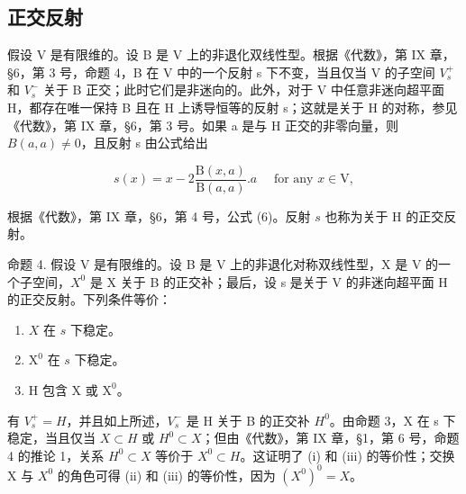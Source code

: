 \subsection{正交反射}

假设 V 是有限维的。设 B 是 V 上的非退化双线性型。根据《代数》，第 IX 章，§6，第 3 号，命题 4，B 在 V 中的一个反射 s 下不变，当且仅当 V 的子空间 \(V_{s}^{+}\) 和 \(V_{s}^{-}\) 关于 B 正交；此时它们是非迷向的。此外，对于 V 中任意非迷向超平面 H，都存在唯一保持 B 且在 H 上诱导恒等的反射 s；这就是关于 H 的对称，参见《代数》，第 IX 章，§6，第 3 号。如果 a 是与 H 正交的非零向量，则 \(B(a,a)\neq0\)，且反射 s 由公式给出

\[
s (x) = x - 2 \frac {\mathrm{B} (x , a)}{\mathrm{B} (a , a)}. a \quad \text { for   any } x \in \mathrm{V},\tag{4}
\]

根据《代数》，第 IX 章，§6，第 4 号，公式 (6)。反射 \(s\) 也称为关于 H 的正交反射。

命题 4. 假设 V 是有限维的。设 B 是 V 上的非退化对称双线性型，X 是 V 的一个子空间，\(X^{0}\) 是 X 关于 B 的正交补；最后，设 s 是关于 V 的非迷向超平面 H 的正交反射。下列条件等价：

\begin{enumerate}
\def\labelenumi{(\roman{enumi})}
\item
  \(X\) 在 \(s\) 下稳定。
\item
  \(\mathrm{X}^0\) 在 \(s\) 下稳定。
\item
  H 包含 X 或 \(\mathrm{X}^0\)。
\end{enumerate}

有 \(V_{s}^{+} = H\)，并且如上所述，\(V_{s}^{-}\) 是 H 关于 B 的正交补 \(H^{0}\)。由命题 3，X 在 s 下稳定，当且仅当 \(X \subset H\) 或 \(H^{0} \subset X\)；但由《代数》，第 IX 章，§1，第 6 号，命题 4 的推论 1，关系 \(H^{0} \subset X\) 等价于 \(X^{0} \subset H\)。这证明了 (i) 和 (iii) 的等价性；交换 X 与 \(X^{0}\) 的角色可得 (ii) 和 (iii) 的等价性，因为 \((X^{0})^{0} = X\)。

